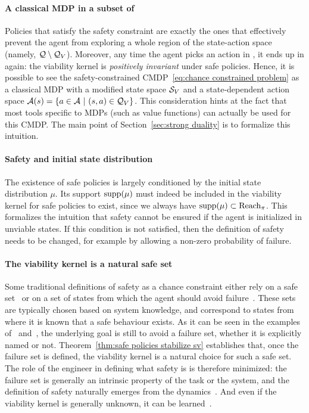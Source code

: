 \paragraph{A classical MDP in a subset of \Q} Policies that satisfy the safety constraint are exactly the ones that effectively prevent the agent from exploring a whole region of the state-action space (namely, $\mathcal{Q}\setminus\mathcal{Q}_{V}$). Moreover, any time the agent picks an action in \QV, it ends up in \SV again: the viability kernel is\emph{ positively invariant} under safe policies. Hence, it is possible to see the safety-constrained CMDP~\eqref{eq:chance constrained problem} as a classical MDP with a modified state space ${\mathcal{S}_{V}}$ and a state-dependent action space $\mathcal{A}(s) = \{a\in\mathcal{A}~|~(s, a)\in\mathcal{Q}_{V}\}$. This consideration hints at the fact that most tools specific to MDPs (such as value functions) can actually be used for this CMDP. The main point of Section~\ref{sec:strong duality} is to formalize this intuition.

\paragraph{Safety and initial state distribution} The existence of safe policies is largely conditioned by the initial state distribution $\mu$. Its support $\operatorname{supp}(\mu)$ must indeed be included in the viability kernel for safe policies to exist, since we always have $\operatorname{supp}(\mu) \subset \operatorname{Reach}_\pi$. This formalizes the intuition that safety cannot be ensured if the agent is initialized in unviable states. If this condition is not satisfied, then the definition of safety needs to be changed, for example by allowing a non-zero probability of failure.

\paragraph{The viability kernel is a natural safe set} Some traditional definitions of safety as a chance constraint either rely on a safe set~\cite{paternain2019safe} or on a set of states from which the agent should avoid failure~\cite{geibel2005risk}. These sets are typically chosen based on system knowledge, and correspond to states from where it is known that a safe behaviour exists. As it can be seen in the examples of~\cite{paternain2019safe} and~\cite{geibel2005risk}, the underlying goal is still to avoid a failure set, whether it is explicitly named or not. Theorem~\ref{thm:safe policies stabilize sv} establishes that, once the failure set is defined, the viability kernel is a natural choice for such a safe set. The role of the engineer in defining what safety is is therefore minimized: the failure set is generally an intrinsic property of the task or the system, and the definition of safety naturally emerges from the dynamics~\cite{heim2019beyond}. And even if the viability kernel is generally unknown, it can be learned~\cite{heim2020learnable}.

